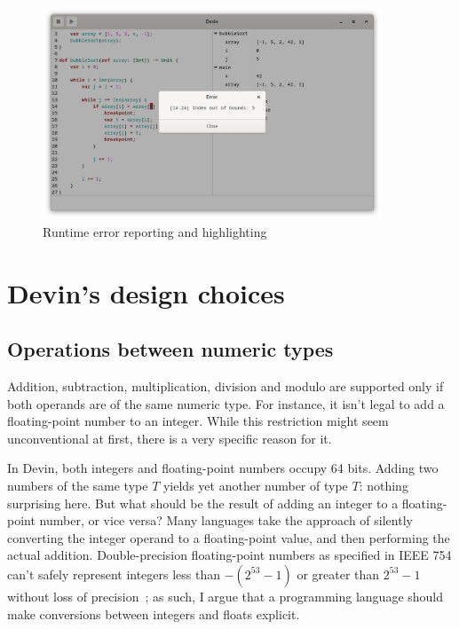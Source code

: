 \documentclass[UdineBachThesis,american,11pt]{PhdThesis}
\begin{document}
  \begin{figure}[H]
    \centering
    \includegraphics[width=0.9\textwidth]{6.png}
    \caption{Runtime error reporting and highlighting}
  \end{figure}

  \section{Devin's design choices}

  \subsection{Operations between numeric types}

  Addition, subtraction, multiplication, division and modulo are supported only
  if both operands are of the same numeric type. For instance, it isn't legal to
  add a floating-point number to an integer. While this restriction might seem
  unconventional at first, there is a very specific reason for it.

  In Devin, both integers and floating-point numbers occupy 64 bits. Adding two
  numbers of the same type $T$ yields yet another number of type $T$: nothing
  surprising here. But what should be the result of adding an integer to a
  floating-point number, or vice versa? Many languages take the approach of
  silently converting the integer operand to a floating-point value, and then
  performing the actual addition. Double-precision floating-point numbers as
  specified in IEEE 754 can't safely represent integers less than
  \mbox{$-\left(2^{53} - 1\right)$} or greater than \mbox{$2^{53} - 1$} without
  loss of precision~\cite{mdn-is-safe-integer}; as such, I argue that a
  programming language should make conversions between integers and floats
  explicit.
\end{document}
